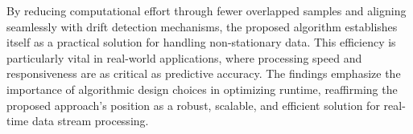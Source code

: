 By reducing computational effort through fewer overlapped samples and aligning seamlessly with drift detection mechanisms, the proposed algorithm establishes itself as a practical solution for handling non-stationary data. This efficiency is particularly vital in real-world applications, where processing speed and responsiveness are as critical as predictive accuracy. The findings emphasize the importance of algorithmic design choices in optimizing runtime, reaffirming the proposed approach’s position as a robust, scalable, and efficient solution for real-time data stream processing.

\begin{table}[H]
  \centering
  \caption{Runtimes (in seconds) Comparison of PA1, MLSMOTE, and MLSOL.}
  \label{tab:4_first_proposal_result_table_2}
  \end{table}

